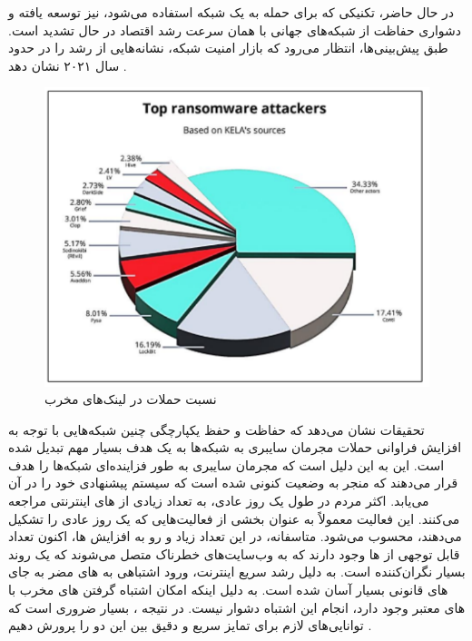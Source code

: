 \documentclass{CSICC2020}
\begin{document}
	در حال حاضر، تکنیکی که برای حمله به یک شبکه استفاده می‌شود، نیز توسعه‌ یافته و دشواری حفاظت از شبکه‌های جهانی با همان سرعت رشد اقتصاد در حال تشدید است. طبق پیش‌بینی‌ها، انتظار می‌رود که بازار امنیت شبکه، نشانه‌هایی از رشد را در حدود سال ۲۰۲۱ نشان دهد \cite{islam2019using}.\\
	\begin{figure}
		\includegraphics[width=.9\linewidth]{Images/related.pdf}
		\caption{
			نسبت حملات در لینک‌های مخرب \cite{santoshi2021twitter}}
		\label{fig:sumXYPlot}
	\end{figure}
	تحقیقات نشان می‌دهد که حفاظت و حفظ یکپارچگی چنین شبکه‌هایی با توجه به افزایش فراوانی حملات مجرمان سایبری به شبکه‌ها به یک هدف بسیار مهم تبدیل شده است. این به این دلیل است که مجرمان سایبری به طور فزاینده‌ای شبکه‌ها را هدف قرار می‌دهند که منجر به وضعیت کنونی شده است که سیستم پیشنهادی خود را در آن می‌یابد. اکثر مردم در طول یک روز عادی، به تعداد زیادی از های اینترنتی مراجعه می‌کنند. این فعالیت معمولاً به عنوان بخشی از فعالیت‌هایی که یک روز عادی را تشکیل می‌دهند، محسوب می‌شود. متاسفانه، در این تعداد زیاد و رو به افزایش ها، اکنون تعداد قابل توجهی از ها وجود دارند که به وب‌سایت‌های خطرناک متصل می‌شوند که یک روند بسیار نگران‌کننده است. به دلیل رشد سریع اینترنت، ورود اشتباهی به های مضر به جای های قانونی بسیار آسان شده است. به دلیل اینکه امکان اشتباه گرفتن های مخرب با های معتبر وجود دارد، انجام این اشتباه دشوار نیست. در نتیجه ، بسیار ضروری است که توانایی‌های لازم برای تمایز سریع و دقیق بین این دو را پرورش دهیم \cite{oyelakin2023performance}. \\
\end{document}
